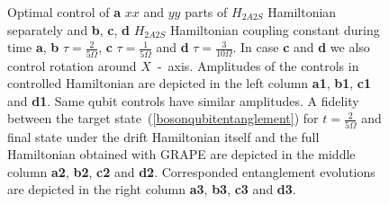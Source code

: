 \documentclass[
aps,%
12pt,%
final,%
notitlepage,%
oneside,%
onecolumn,%
nobibnotes,%
nofootinbib,%
superscriptaddress,%
noshowpacs,%
centertags]%
{revtex4}
\begin{document}
\newpage

\begin{figure}[t!]
\setcaptionmargin{5mm}
\onelinecaptionsfalse
{}
\caption{
    Optimal control of {\bf a} $xx$ and $yy$ parts of $H_{2A2S}$ Hamiltonian separately and {\bf b}, {\bf c}, {\bf d} $H_{2A2S}$ Hamiltonian coupling constant during time {\bf a}, {\bf b} $\tau=\frac{2}{5\Omega}$, {\bf c} $\tau=\frac{1}{5\Omega}$ and {\bf d} $\tau=\frac{3}{10\Omega}$. In case {\bf c} and {\bf d} we also control rotation around $X$~-~axis. Amplitudes of the controls in controlled Hamiltonian are depicted in the left column {\bf a1}, {\bf b1}, {\bf c1} and {\bf d1}. Same qubit controls have similar amplitudes. A fidelity between the target state~(\ref{bosonqubitentanglement}) for $t=\frac{2}{5\Omega}$ and final state under the drift Hamiltonian itself and the full Hamiltonian obtained with GRAPE are depicted in the middle column {\bf a2}, {\bf b2}, {\bf c2} and {\bf d2}. Corresponded entanglement evolutions are depicted in the right column {\bf a3}, {\bf b3}, {\bf c3} and {\bf d3}.
}
\label{fig3:time-depended}
\end{figure}
\end{document}
